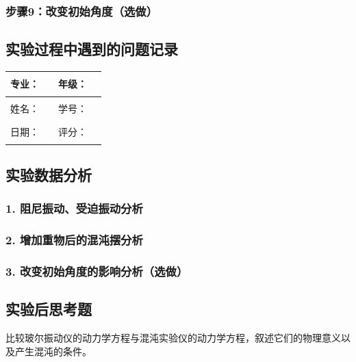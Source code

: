\documentclass[dvipsnames, svgnames,a4paper,11pt]{article}
\newcommand{\recordblank}[1]{\par\vspace*{#1}\par}
\begin{document}
\recordblank{7cm}

\subsubsection{步骤9：改变初始角度（选做）}


\recordblank{7cm}


\recordblank{7cm}


\recordblank{7cm}

\clearpage
\subsection{实验过程中遇到的问题记录}
\recordblank{5.0cm}
\clearpage
\noindent\begin{minipage}{\textwidth}
	\renewcommand\arraystretch{1.7}
	\begin{tabularx}{\textwidth}{|X|X|X|X|}
	\hline
	专业：& \rule{2.5cm}{0.4pt} & 年级：& \rule{2.5cm}{0.4pt}\\
	\hline
	姓名：& \rule{2.5cm}{0.4pt} & 学号：& \rule{2.5cm}{0.4pt}\\
	\hline
	日期：& \rule{2.5cm}{0.4pt} & 评分：& \rule{2.5cm}{0.4pt}\\
	\hline
	\end{tabularx}
\vspace{0.8em}
\subsection{实验数据分析}
\subsubsection*{1. 阻尼振动、受迫振动分析}
\recordblank{3.5cm}
\end{minipage}

\subsubsection*{2. 增加重物后的混沌摆分析}
\recordblank{3.5cm}
\subsubsection*{3. 改变初始角度的影响分析（选做）}
\recordblank{3.5cm}
\subsection{实验后思考题}

\begin{question}
比较玻尔振动仪的动力学方程与混沌实验仪的动力学方程，叙述它们的物理意义以及产生混沌的条件。
\end{question}
\recordblank{4cm}
\end{document}

